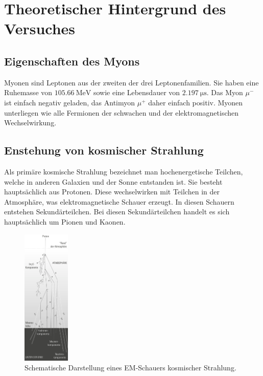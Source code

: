 \section{Theoretischer Hintergrund des Versuches}
\label{sec:Theorie}

\subsection{Eigenschaften des Myons}
\label{subsec:Eigenschaften}

Myonen sind Leptonen aus der zweiten der drei Leptonenfamilien. Sie haben
eine Ruhemasse von $\SI{105.66}{\mega\electronvolt}$ sowie eine Lebensdauer
von $\SI{2.197}{\micro\second}$. Das Myon $\mu^{-}$ ist einfach negativ geladen,
das Antimyon $\mu^{+}$ daher einfach positiv.
Myonen unterliegen wie alle Fermionen der schwachen und der elektromagnetischen
Wechselwirkung.

\subsection{Enstehung von kosmischer Strahlung}
\label{subsec:kosmischeStrahlung}

Als primäre kosmische Strahlung bezeichnet man hochenergetische Teilchen, welche
in anderen Galaxien und der Sonne entstanden ist. Sie besteht hauptsächlich aus Protonen.
Diese wechselwirken mit Teilchen in der Atmosphäre, was elektromagnetische
Schauer erzeugt. In diesen Schauern entstehen Sekundärteilchen. Bei diesen
Sekundärteilchen handelt es sich hauptsächlich um Pionen und Kaonen.

\begin{figure}
  \centering
  \includegraphics[width=0.2\textwidth]{pictures/Schauer.png}
  \caption{Schematische Darstellung eines EM-Schauers kosmischer Strahlung. \cite{Q1}}
  \label{fig:schauer}
\end{figure}
\noindent

